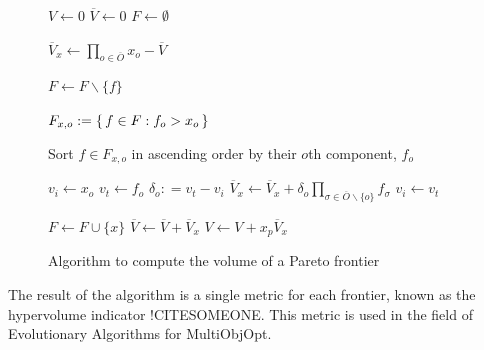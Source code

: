 \begin{figure}[!ht]
\caption{Algorithm to compute the volume of a Pareto frontier}
\begin{algorithmic}[1]

\State $V \gets 0$
\State $\overbar{V} \gets 0$
\State $F \gets \emptyset$


	\State $\overbar{V}_x \gets \prod_{o \in \overbar{O}} x_{o} - \overbar{V}$
		
			\State $F \gets F \backslash \{f\}$
		\EndIf
	\EndFor
	
	
		\State $F_{x,o} := \set{f \in F : f_o > x_o}$
		
		\State Sort $f \in F_{x,o}$ in ascending order by their $o$th component, $f_o$
		
		\State $v_i \gets x_o$
			\State $v_t \gets f_o$
			\State $\delta_o :	= v_t - v_i$
			\State $\overbar{V}_x \gets \overbar{V}_x + \delta_o \prod_{\sigma \in \overbar{O} \backslash \{o\}} f_\sigma$
			\State $v_i \gets v_t$
		\EndFor
		
	\EndFor
	
	\State $F \gets F \cup \{x\}$
	\State $\overbar{V} \gets \overbar{V} + \overbar{V}_x$
	\State $V \gets V + x_p \overbar{V}_x$
\EndFor


\end{algorithmic}
\end{figure}

The result of the algorithm is a single metric for each frontier, known as the hypervolume indicator !CITESOMEONE. This metric is used in the field of Evolutionary Algorithms for MultiObjOpt. 